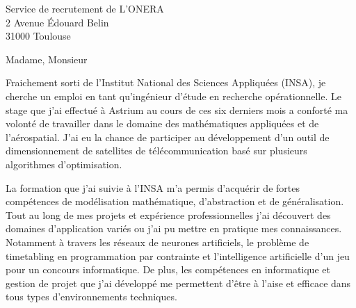 \documentclass[12pt]{lettre}
\begin{document}
 
\begin{letter}{Service de recrutement de L'ONERA\\2 Avenue Édouard Belin\\31000 Toulouse}
\address{Victor Cameo Ponz\\47 rue Guynemer\\31200 Toulouse}
\nofax

\opening{Madame, Monsieur}

Fraichement sorti de l'Institut National des Sciences Appliquées (INSA), je cherche un emploi en tant qu'ingénieur d'étude en recherche opérationnelle. Le stage que j'ai effectué à Astrium au cours de ces six derniers mois a conforté ma volonté de travailler dans le domaine des mathématiques appliquées et de l'aérospatial.
J'ai eu la chance de participer au développement d'un outil de dimensionnement de satellites de télécommunication basé sur plusieurs algorithmes d'optimisation.%


La formation que j'ai suivie à l'INSA m'a permis d'acquérir de fortes compétences de modélisation mathématique, d'abstraction et de généralisation. 
Tout au long de mes projets et expérience professionnelles j'ai découvert des domaines d'application variés ou j'ai pu mettre en pratique mes connaissances. Notamment à travers les réseaux de neurones artificiels, le problème de timetabling en programmation par contrainte et l'intelligence artificielle d'un jeu pour un concours informatique. De plus, les compétences en informatique et gestion de projet que j'ai développé me permettent d'être à l'aise et efficace dans tous types d'environnements techniques.





\end{letter}
\end{document}
